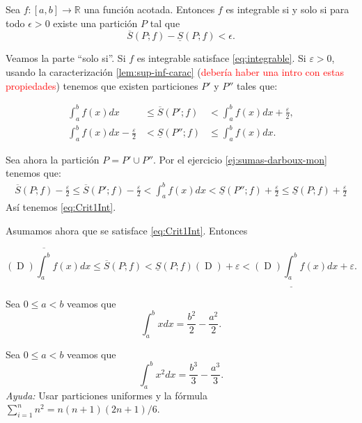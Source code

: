  
\begin{teorema}{}  Sea $f:[a,b]\to\mathbb{R}$ una función acotada. Entonces  $f$ es integrable si y solo si para todo $\epsilon>0$ existe una partición $P$ tal que 
\begin{equation}\label{eq:Crit1Int}
 \overline{S}(P;f)-\underline{S}(P;f)<\epsilon.
\end{equation}
 
\end{teorema}

\begin{demo} Veamos la parte ``solo si''. Si $f$ es integrable satisface \eqref{eq:integrable}. Si $\varepsilon>0$, usando la caracterización \eqref{lem:sup-inf-carac} (\textcolor{red}{debería haber una intro con estas propiedades}) tenemos que existen particiones $P'$ y $P''$ tales que:


\begin{eqnarray*}
 \int_a^bf(x)dx&\leq \overline{S}(P';f)&<\int_a^bf(x)dx+\frac{\varepsilon}{2},\\
 \int_a^bf(x)dx-\frac{\varepsilon}{2}&<\underline{S}(P'';f)&\leq\int_a^bf(x)dx.
\end{eqnarray*}

Sea ahora la partición $P=P'\cup P''$. Por el ejercicio \eqref{ej:sumas-darboux-mon} tenemos que:
\begin{multline*}
 \overline{S}(P;f)-\frac{\varepsilon}{2}\leq \overline{S}(P';f)-\frac{\varepsilon}{2}<\int_a^bf(x)dx<\underline{S}(P'';f)+\frac{\varepsilon}{2}
 \leq \underline{S}(P;f)+\frac{\varepsilon}{2}
\end{multline*}
Así tenemos \eqref{eq:Crit1Int}. 

Asumamos ahora que se satisface \eqref{eq:Crit1Int}. Entonces 

 \[
   (\mathop{D})\overline{\int_a^b}f(x)dx\leq \overline{S}(P;f)<
   \underline{S}(P;f)(\mathop{D})+\varepsilon<(\mathop{D})\underline{\int_a^b}f(x)dx +\varepsilon.
 \]


 
\end{demo}


\begin{ejemplo}{} Sea $0\leq a<b$ veamos que 
\[
 \int_a^b x dx=\frac{b^2}{2}-\frac{a^2}{2}.
\]
\end{ejemplo}


\begin{ejercicio}{} Sea $0\leq a<b$ veamos que 
\[
 \int_a^b x^2 dx=\frac{b^3}{3}-\frac{a^3}{3}.
\]
{\em Ayuda:} Usar particiones uniformes y la fórmula $\sum_{i=1}^nn^2= n(n+1)(2n+1)/6$.
\end{ejercicio}

